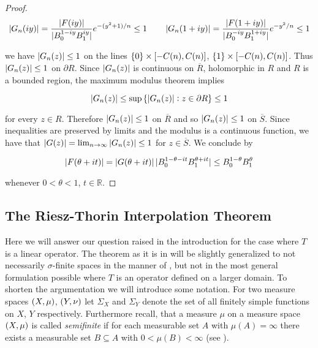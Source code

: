 \begin{proof}
\begin{equation*}
	\abs[0]{ G_n(iy)} = \frac{\abs[0]{F(iy)}}{\abs[0]{B_0^{1 - iy} B_1^{iy}}}e^{-\del[0]{y^2 + 1 }/n} \leq 1 \qquad \abs[0]{ G_n(1 + iy)} =	\frac{\abs[0]{ F(1 + iy)}}{\abs[0]{ B_0^{-iy}B_1^{1 + iy}}}e^{-y^2/n} \leq 1
\end{equation*}

\noindent we have $\abs[0]{ G_n(z)} \leq 1$ on the lines $\cbr{0} \times \intcc[0]{-C(n),C(n)}$, $\cbr{1} \times \intcc[0]{-C(n),C(n)}$. Thus $\abs[0]{ G_n(z) } \leq 1$ on $\partial R$. Since $\abs[0]{ G_n(z)}$ is continuous on $\overline{R}$, holomorphic in $R$ and $R$ is a bounded region, the maximum modulus theorem implies

\begin{equation*}
	\abs[0]{ G_n(z)} \leq \sup\cbr[0]{\abs[0]{G_n(z) } : z \in \partial R} \leq 1
\end{equation*}

\noindent for every $z \in R$. Therefore $\abs[0]{ G_n(z)} \leq 1$ on $\overline{R}$ and so $\abs[0]{ G_n(z)}\leq 1$ on $\overline{S}$. Since inequalities are preserved by limits and the modulus is a continuous function, we have that $\abs[0]{ G(z)} = \lim_{n \to \infty} \abs[0]{ G_n(z) } \leq 1$ for $z \in \overline{S}$. We conclude by 

\begin{equation*}
	\abs[0]{ F(\theta + it) } = \abs[0]{ G(\theta + it)} \abs[0]{B_0^{1 - \theta - it}B_1^{\theta + it}} \leq B_0^{1 - \theta} B_1^{\theta}
\end{equation*}

\noindent whenever $0 < \theta < 1$, $t \in \mathbb{R}$.
\end{proof}

\subsection{The Riesz-Thorin Interpolation Theorem}
Here we will answer our question raised in the introduction for the case where $T$ is a linear operator. The theorem as it is in \cite[37]{grafakos:fourier:2014} will be slightly generalized to not necessarily $\sigma$-finite spaces in the manner of \cite[200]{folland:real_analysis:1999}, but not in the most general formulation possible where $T$ is an operator defined on a larger domain. To shorten the argumentation we will introduce some notation. For two measure spaces $\del[0]{ X,\mu }$, $\del[0]{ Y,\nu }$ let $\Sigma_X$ and $\Sigma_Y$ denote the set of all finitely simple functions on $X$, $Y$ respectively. Furthermore recall, that a measure $\mu$ on a measure space $\del{X,\mu}$ is called \emph{semifinite} if for each measurable set $A$ with $\mu(A) = \infty$ there exists a measurable set $B \subseteq A$ with $0 < \mu(B) < \infty$ (see \cite[25]{folland:real_analysis:1999}). 


